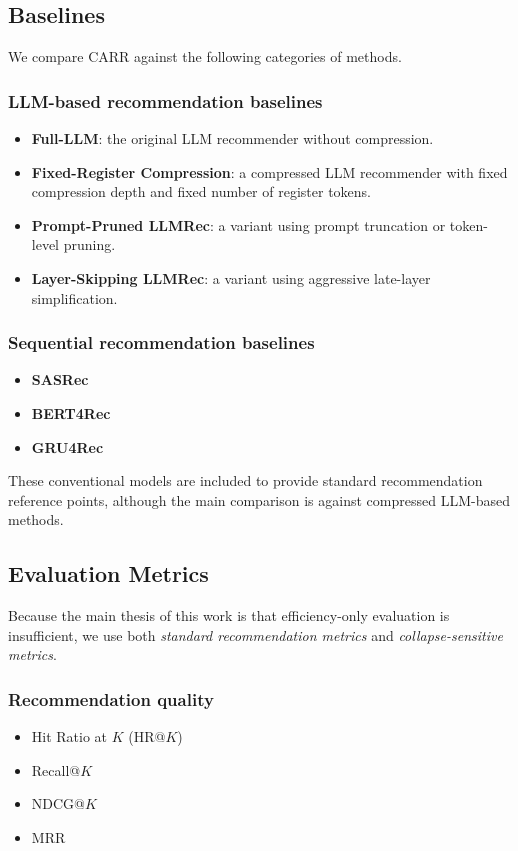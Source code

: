 \documentclass[11pt]{article}
\begin{document}
\subsection{Baselines}

We compare CARR against the following categories of methods.

\subsubsection{LLM-based recommendation baselines}
\begin{itemize}
    \item \textbf{Full-LLM}: the original LLM recommender without compression.
    \item \textbf{Fixed-Register Compression}: a compressed LLM recommender with fixed compression depth and fixed number of register tokens.
    \item \textbf{Prompt-Pruned LLMRec}: a variant using prompt truncation or token-level pruning.
    \item \textbf{Layer-Skipping LLMRec}: a variant using aggressive late-layer simplification.
\end{itemize}

\subsubsection{Sequential recommendation baselines}
\begin{itemize}
    \item \textbf{SASRec}
    \item \textbf{BERT4Rec}
    \item \textbf{GRU4Rec}
\end{itemize}

These conventional models are included to provide standard recommendation reference points, although the main comparison is against compressed LLM-based methods.

\subsection{Evaluation Metrics}

Because the main thesis of this work is that efficiency-only evaluation is insufficient, we use both \emph{standard recommendation metrics} and \emph{collapse-sensitive metrics}.

\subsubsection{Recommendation quality}
\begin{itemize}
    \item Hit Ratio at $K$ (HR@$K$)
    \item Recall@$K$
    \item NDCG@$K$
    \item MRR
\end{itemize}
\end{document}

